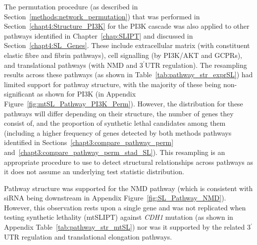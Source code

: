 The permutation procedure (as described in Section~\ref{methods:network_permutation}) that was performed in Section~\ref{chapt4:Structure_PI3K} for the \gls{PI3K} cascade was also applied to other pathways identified in Chapter~\ref{chap:SLIPT} and discussed in Section~\ref{chapt4:SL_Genes}. These include extracellular matrix (with constituent elastic fibre and fibrin pathways), cell signalling (by PI3K/AKT and GCPRs), and translational pathways (with \gls{NMD} and 3$^\prime$\gls{UTR} regulation). The resampling results across these pathways (as shown in Table~\ref{tab:pathway_str_exprSL}) had limited support for pathway structure, with the majority of these being non-significant as shown for PI3K (in Appendix Figure~\ref{fig:mtSL_Pathway_PI3K_Perm}). However, the distribution for these pathways will differ depending on their structure, the number of genes they consist of, and the proportion of synthetic lethal candidates among them (including a higher frequency of genes detected by both methods pathways identified in Sections~\ref{chapt3:compare_pathway_perm} and~\ref{chapt3:compare_pathway_perm_stad_SL}). This resampling is an appropriate procedure to use to detect structural relationships across pathways as it does not assume an underlying test statistic distribution.

Pathway structure was supported for the \gls{NMD} pathway (which is consistent with \gls{siRNA} being downstream in Appendix Figure~\ref{fig:SL_Pathway_NMD}). However, this observation rests upon a single gene and was not replicated when testing synthetic lethality (mtSLIPT) against \textit{CDH1} mutation (as shown in Appendix Table~\ref{tab:pathway_str_mtSL}) nor was it supported by the related 3$^\prime$\gls{UTR} regulation and translational elongation pathways.

